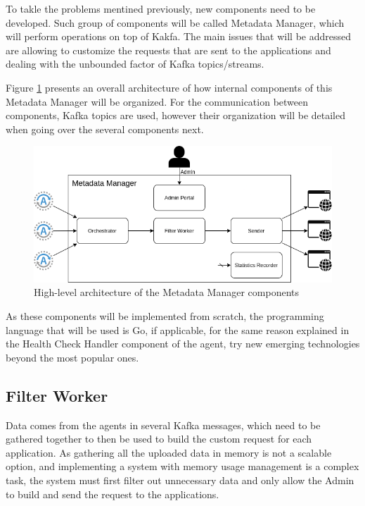 To takle the problems mentined previously, new components need to be developed.
Such group of components will be called Metadata Manager, which will perform operations on top of Kakfa.
The main issues that will be addressed are allowing to customize the requests that are sent to the applications and dealing with the unbounded factor of Kafka topics/streams.

Figure \ref{fig:metadata-manager} presents an overall architecture of how internal components of this Metadata Manager will be organized.
For the communication between components, Kafka topics are used, however their organization will be detailed when going over the several components next.

\begin{figure}[H]
    \center
    \includegraphics[width=\textwidth]{metadata-manager}
    \caption{High-level architecture of the Metadata Manager components}
    \label{fig:metadata-manager}
\end{figure}

As these components will be implemented from scratch, the programming language that will be used is Go, if applicable, for the same reason explained in the Health Check Handler component of the agent, try new emerging technologies beyond the most popular ones.

\subsection{Filter Worker}

Data comes from the agents in several Kafka messages, which need to be gathered together to then be used to build the custom request for each application.
As gathering all the uploaded data in memory is not a scalable option, and implementing a system with memory usage management is a complex task, the system must first filter out unnecessary data and only allow the Admin to build and send the request to the applications.

